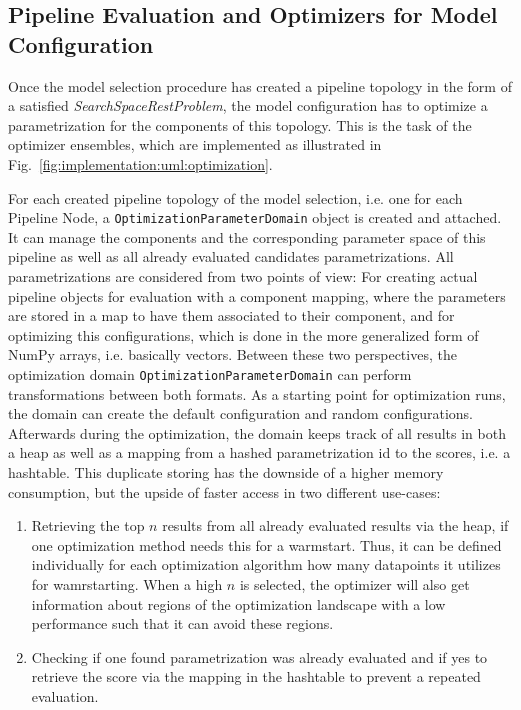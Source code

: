 \subsection{Pipeline Evaluation and Optimizers for Model Configuration}
\label{sec:implementation:components:optimization}
Once the model selection procedure has created a pipeline topology in the form of a satisfied \textit{SearchSpaceRestProblem}, the model configuration has to optimize a parametrization for the components of this topology.
This is the task of the optimizer ensembles, which are implemented as illustrated in Fig.~\ref{fig:implementation:uml:optimization}.

For each created pipeline topology of the model selection, i.e. one for each Pipeline Node, a \texttt{OptimizationParameterDomain} object is created and attached.
It can manage the components and the corresponding parameter space of this pipeline as well as all already evaluated candidates parametrizations.\newline
All parametrizations are considered from two points of view: For creating actual pipeline objects for evaluation with a component mapping, where the parameters are stored in a map to have them associated to their component, and for optimizing this configurations, which is done in the more generalized form of NumPy arrays, i.e. basically vectors.
Between these two perspectives, the optimization domain \texttt{OptimizationParameterDomain} can perform transformations between both formats.\newline
As a starting point for optimization runs, the domain can create the default configuration and random configurations.
Afterwards during the optimization, the domain keeps track of all results in both a heap as well as a mapping from a hashed parametrization id to the scores, i.e. a hashtable.
This duplicate storing has the downside of a higher memory consumption, but the upside of faster access in two different use-cases:
\begin{enumerate}
    \item Retrieving the top $n$ results from all already evaluated results via the heap, if one optimization method needs this for a warmstart. Thus, it can be defined individually for each optimization algorithm how many datapoints it utilizes for wamrstarting. When a high $n$ is selected, the optimizer will also get information about regions of the optimization landscape with a low performance such that it can avoid these regions.
    \item Checking if one found parametrization was already evaluated and if yes to retrieve the score via the mapping in the hashtable to prevent a repeated evaluation.
\end{enumerate}

